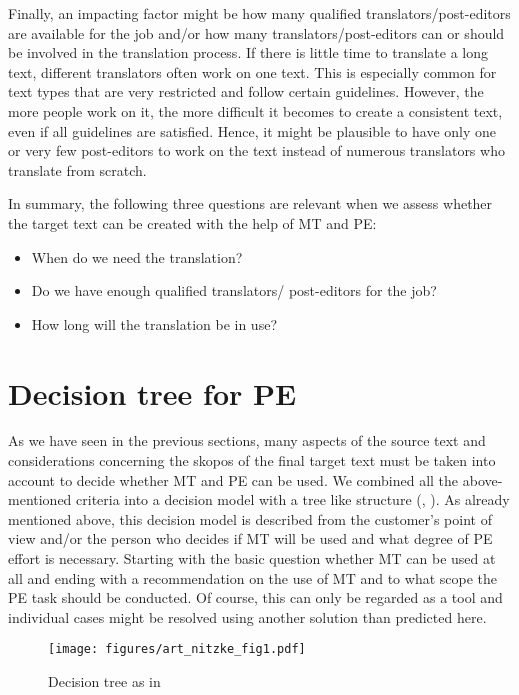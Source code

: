 Finally, an impacting factor might be how many qualified translators/post-editors are available for the job and/or how many translators/post-editors can or should be involved in the translation process. If there is little time to translate a long text, different translators often work on one text. This is especially common for text types that are very restricted and follow certain guidelines. However, the more people work on it, the more difficult it becomes to create a consistent text, even if all guidelines are satisfied. Hence, it might be plausible to have only one or very few post-editors to work on the text instead of numerous translators who translate from scratch.

In summary, the following three questions are relevant when we assess whether the target text can be created with the help of MT and PE:
\begin{itemize}
    \item When do we need the translation? 
    \item Do we have enough qualified translators/ post-editors for the job?
    \item How long will the translation be in use?
\end{itemize}

\section{Decision tree for PE}\label{sec:8:4}
\largerpage
As we have seen in the previous sections, many aspects of the source text and considerations concerning the skopos \citep{reiss2014towards} of the final target text must be taken into account to decide whether MT and PE can be used. We combined all the above-mentioned criteria into a decision model with a tree like structure (, \citealt[246]{nitzke2019risk}). As already mentioned above, this decision model is described from the customer’s point of view and/or the person who decides if MT will be used and what degree of PE effort is necessary. Starting with the basic question whether MT can be used at all and ending with a recommendation on the use of MT and to what scope the PE task should be conducted. Of course, this can only be regarded as a tool and individual cases might be resolved using another solution than predicted here.


\begin{sidewaysfigure}
\texttt{[image: figures/art\_nitzke\_fig1.pdf]}
\caption{Decision tree as in \citet[246]{nitzke2019risk}}
\label{fig:key:8:7}
\end{sidewaysfigure}

